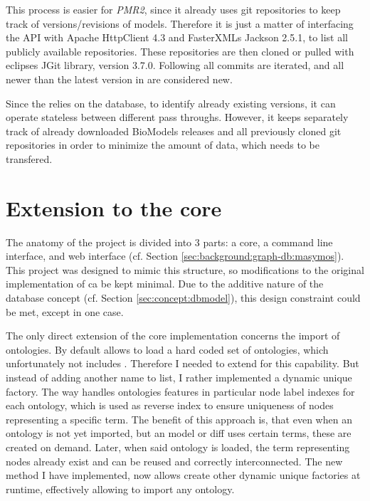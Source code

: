 	This process is easier for \emph{PMR2}, since it already uses git repositories to keep track of versions/revisions of models. Therefore it is just a matter of interfacing the \rest API with Apache HttpClient 4.3 and FasterXMLs Jackson 2.5.1, to list all publicly available repositories. These repositories are then cloned or pulled with eclipses JGit library, version 3.7.0. Following all commits are iterated, and all newer than the latest version in \masymos are considered new.

	Since the \modelcrawler relies on the \masymos database, to identify already existing versions, it can operate stateless between different pass throughs. However, it keeps separately track of already downloaded BioModels releases and all previously cloned git repositories in order to minimize the amount of data, which needs to be transfered.

\section{Extension to the \masymos core}
	\label{sec:impl:masymos}
	The anatomy of the \masymos project is divided into 3 parts: a core, a command line interface, and web \rest interface (cf. Section \ref{sec:background:graph-db:masymos}). This project was designed to mimic this structure, so modifications to the original implementation of \masymos ca be kept minimal. Due to the additive nature of the database concept (cf. Section \ref{sec:concept:dbmodel}), this design constraint could be met, except in one case.
	
	The only direct extension of the core implementation concerns the import of ontologies. By default \masymos allows to load a hard coded set of ontologies, which unfortunately not includes \comodi. Therefore I needed to extend \masymos for this capability. But instead of adding another name to list, I rather implemented a dynamic unique factory. The way \masymos handles ontologies features in particular node label indexes for each ontology, which is used as reverse index to ensure uniqueness of nodes representing a specific term.
	The benefit of this approach is, that even when an ontology is not yet imported, but an model or diff uses certain terms, these are created on demand. Later, when said ontology is loaded, the term representing nodes already exist and can be reused and correctly interconnected.
	The new method I have implemented, now allows create other dynamic unique factories at runtime, effectively allowing to import any ontology.

